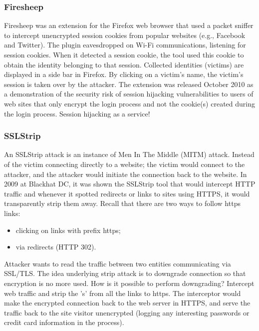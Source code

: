 \documentclass[a4paper, 10pt, titlepage]{article}
\begin{document}
\subsubsection*{Firesheep}
Firesheep was an extension for the Firefox web browser that used a packet sniffer to intercept unencrypted session cookies from popular websites (e.g., Facebook and Twitter). The plugin eavesdropped on Wi-Fi communications, listening for session cookies. When it detected a session cookie, the tool used this cookie to obtain the identity belonging to that session. Collected identities (victims) are displayed in a side bar in Firefox. By clicking on a victim's name, the victim's session is taken over by the attacker. The extension was released October 2010 as a demonstration of the security risk of session hijacking vulnerabilities to users of web sites that only encrypt the login process and not the cookie(s) created during the login process. Session hijacking as a service!

\subsubsection{SSLStrip}
An SSLStrip attack is an instance of Men In The Middle (MITM) attack. Instead of the victim connecting directly to a website; the victim would connect to the attacker, and the attacker would initiate the connection back to the website.
In 2009 at Blackhat DC, it was shown the SSLStrip tool that would intercept HTTP traffic and whenever it spotted redirects or links to sites using HTTPS, it would transparently strip them away. Recall that there are two ways to follow https links:
\begin{itemize}
\item clicking on links with prefix https;
\item via redirects (HTTP 302).
\end{itemize} 
Attacker wants to read the traffic between two entities communicating via SSL/TLS. The idea underlying strip attack is to downgrade connection so that encryption is no more used. How is it possible to perform downgrading? Intercept web traffic and strip the 's' from all the links to https. The interceptor would make the encrypted connection back to the web server in HTTPS, and serve the traffic back to the site visitor unencrypted (logging any interesting passwords or credit card information in the process).
\end{document}
